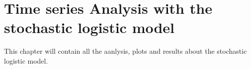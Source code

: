 \chapter{Time series Analysis with the stochastic logistic model}


This chapter will contain all the aanlysis, plots and results about the stochastic logistic model.